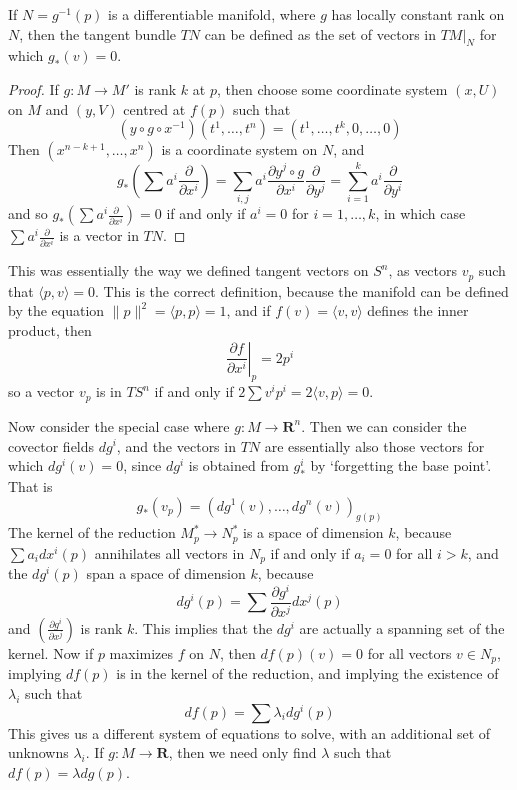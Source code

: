 \begin{theorem}
    If $N = g^{-1}(p)$ is a differentiable manifold, where $g$ has locally constant rank on $N$, then the tangent bundle $TN$ can be defined as the set of vectors in $TM|_N$ for which $g_*(v) = 0$.
\end{theorem}
\begin{proof}
    If $g: M \to M'$ is rank $k$ at $p$, then choose some coordinate system $(x,U)$ on $M$ and $(y,V)$ centred at $f(p)$ such that
    \[ (y \circ g \circ x^{-1})(t^1, \dots, t^n) = (t^1, \dots, t^k, 0, \dots, 0) \]
    Then $(x^{n-k+1}, \dots, x^n)$ is a coordinate system on $N$, and
    \[ g_* \left( \sum a^i \frac{\partial}{\partial x^i} \right) = \sum_{i,j} a^i \frac{\partial y^j \circ g}{\partial x^i} \frac{\partial}{\partial y^j} = \sum_{i = 1}^k a^i \frac{\partial}{\partial y^i} \]
    and so $g_* \left(\sum a^i \frac{\partial}{\partial x^i} \right) = 0$ if and only if $a^i = 0$ for $i = 1, \dots, k$, in which case $\sum a^i \frac{\partial}{\partial x^i}$ is a vector in $TN$.
\end{proof}

This was essentially the way we defined tangent vectors on $S^n$, as vectors $v_p$ such that $\langle p, v \rangle = 0$. This is the correct definition, because the manifold can be defined by the equation $\| p \|^2 = \langle p, p \rangle = 1$, and if $f(v) = \langle v, v \rangle$ defines the inner product, then
%
\[ \left. \frac{\partial f}{\partial x^i} \right|_p = 2p^i \]
%
so a vector $v_p$ is in $TS^n$ if and only if $2 \sum v^i p^i = 2 \langle v, p \rangle = 0$.

Now consider the special case where $g: M \to \mathbf{R}^n$. Then we can consider the covector fields $dg^i$, and the vectors in $TN$ are essentially also those vectors for which $dg^i(v) = 0$, since $dg^i$ is obtained from $g^i_*$ by `forgetting the base point'. That is
%
\[ g_*(v_p) = (dg^1(v), \dots, dg^n(v))_{g(p)} \]
%
The kernel of the reduction $M^*_p \to N^*_p$ is a space of dimension $k$, because $\sum a_i dx^i(p)$ annihilates all vectors in $N_p$ if and only if $a_i = 0$ for all $i > k$, and the $dg^i(p)$ span a space of dimension $k$, because
%
\[ dg^i(p) = \sum \frac{\partial g^i}{\partial x^j} dx^j(p) \]
%
and $\left( \frac{\partial g^i}{\partial x^j} \right)$ is rank $k$. This implies that the $dg^i$ are actually a spanning set of the kernel. Now if $p$ maximizes $f$ on $N$, then $df(p)(v) = 0$ for all vectors $v \in N_p$, implying $df(p)$ is in the kernel of the reduction, and implying the existence of $\lambda_i$ such that
%
\[ df(p) = \sum \lambda_i dg^i(p) \]
%
This gives us a different system of equations to solve, with an additional set of unknowns $\lambda_i$. If $g: M \to \mathbf{R}$, then we need only find $\lambda$ such that $df(p) = \lambda dg(p)$.

